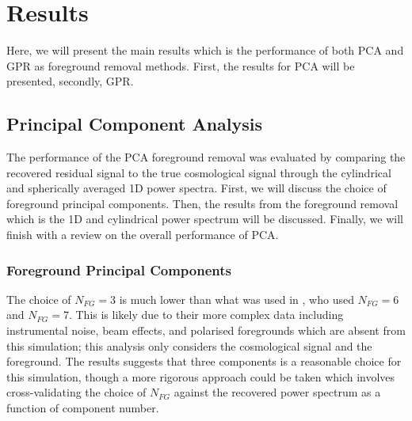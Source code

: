 \section{Results}
\label{sec:results}

Here, we will present the main results which is the performance of both PCA and GPR as foreground removal methods. First, the results for PCA will be presented, secondly, GPR.

\subsection{Principal Component Analysis}

The performance of the PCA foreground removal was evaluated by comparing the recovered residual signal to the true cosmological signal through the cylindrical and spherically averaged 1D power spectra. First, we will discuss the choice of foreground principal components. Then, the results from the foreground removal which is the 1D and cylindrical power spectrum will be discussed. Finally, we will finish with a review on the overall performance of PCA.

\subsubsection{Foreground Principal Components}


The choice of $N_{FG} = 3$ is much lower than what was used in \cite{soaresGaussianProcessRegression2022}, who used $N_{FG} = 6$ and $N_{FG} = 7$. This is likely due to their more complex data including instrumental noise, beam effects, and polarised foregrounds which are absent from this simulation; this analysis only considers the cosmological signal and the foreground. The results suggests that three components is a reasonable choice for this simulation, though a more rigorous approach could be taken which involves cross-validating the choice of $N_{FG}$ against the recovered power spectrum as a function of component number. 


